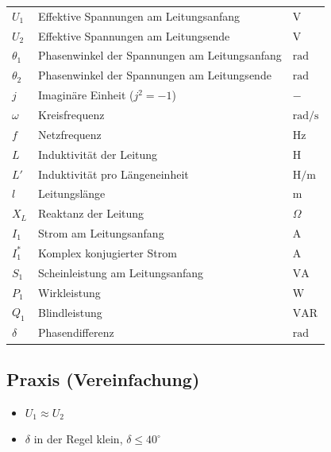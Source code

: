\renewcommand{\arraystretch}{1.2}
\begin{tabular}{@{} l p{6cm} l @{}}
$U_1$        & Effektive Spannungen am Leitungsanfang \dotfill & $\mathrm{V}$ \\
$U_2$        & Effektive Spannungen am Leitungsende \dotfill & $\mathrm{V}$ \\
$\theta_1$ & Phasenwinkel der Spannungen am Leitungsanfang \dotfill & $\mathrm{rad}$ \\
$\theta_2$ & Phasenwinkel der Spannungen am Leitungsende \dotfill & $\mathrm{rad}$ \\
$j$                 & Imaginäre Einheit ($j^2 = -1$) \dotfill & $-$ \\
$\omega$            & Kreisfrequenz \dotfill & $\mathrm{rad/s}$ \\
$f$                 & Netzfrequenz \dotfill & $\mathrm{Hz}$ \\
$L$                 & Induktivität der Leitung \dotfill & $\mathrm{H}$ \\
$L'$                & Induktivität pro Längeneinheit \dotfill & $\mathrm{H/m}$ \\
$l$                 & Leitungslänge \dotfill & $\mathrm{m}$ \\
$X_L$               & Reaktanz der Leitung  \dotfill & $\Omega$ \\
$I_1$               & Strom am Leitungsanfang \dotfill & $\mathrm{A}$ \\
$I_1^*$             & Komplex konjugierter Strom \dotfill & $\mathrm{A}$ \\
$S_1$               & Scheinleistung am Leitungsanfang \dotfill & $\mathrm{VA}$ \\
$P_1$               & Wirkleistung \dotfill & $\mathrm{W}$ \\
$Q_1$               & Blindleistung \dotfill & $\mathrm{VAR}$ \\
$\delta$           & Phasendifferenz \dotfill & $\mathrm{rad}$ \\
\end{tabular}

\newcolumn
\subsection{Praxis (Vereinfachung)}

\begin{itemize}
    \item $U_1 \approx U_2$
    \item $\delta$ in der Regel klein, $\delta \leq 40^\circ$
\end{itemize}


